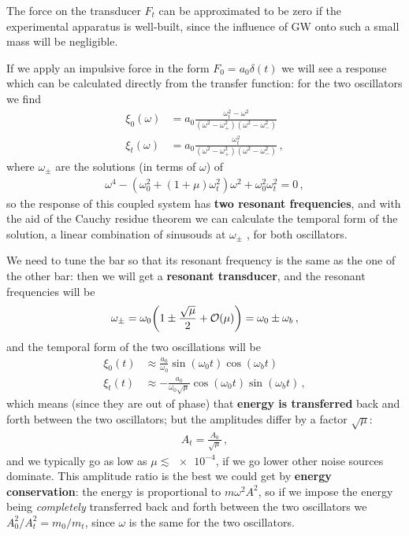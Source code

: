 \documentclass[main.tex]{subfiles}
\begin{document}
The force on the transducer \(F_t\) can be approximated to be zero if the experimental apparatus is well-built, since the influence of GW onto such a small mass will be negligible.

If we apply an impulsive force in the form \(F_0 = a_0 \delta (t)\) we will see a response which can be calculated directly from the transfer function: for the two oscillators we find 
%
\begin{align}
\xi_0 (\omega ) &= a_0 \frac{\omega_{t}^2 - \omega^2}{(\omega^2 - \omega^2_{+} ) (\omega^2- \omega^2_{-})}  \\
\xi_{t} (\omega ) &= a_0 \frac{\omega_{t}^2}{(\omega^2 - \omega^2_{+}) (\omega^2- \omega^2_{-})}
\,,
\end{align}
%
where \(\omega_{\pm}\) are the solutions (in terms of \(\omega \)) of 
%
\begin{align}
\omega^4 - (\omega^2_{0} + (1+\mu )\omega_{t}^2) \omega^2 + \omega_0^2 \omega_t^2 = 0
\,,
\end{align}
%
so the response of this coupled system has \textbf{two resonant frequencies}, and with the aid of the Cauchy residue theorem we can calculate the temporal form of the solution, a linear combination of sinusouds at \(\omega_{\pm}\) \cite[eqs.\ 8.79--80]{maggioreGravitationalWavesVolume2007}, for both oscillators.

We need to tune the bar so that its resonant frequency is the same as the one of the other bar: then we will get a \textbf{resonant transducer}, and the resonant frequencies will be 
%
\begin{align}
\omega_{\pm} = \omega_0 \qty(1 \pm \frac{\sqrt{\mu }}{2} + \mathcal{O}(\mu ))= \omega_0 \pm \omega_{b}
\,,
\end{align}
%
and the temporal form of the two oscillations will be 
%
\begin{align}
\xi_0 (t) &\approx \frac{a_0 }{\omega_0} \sin(\omega_0 t) \cos(\omega_{b}t)  \\
\xi_t (t) &\approx - \frac{a_0 }{\omega_0 \sqrt{\mu }} \cos(\omega_0 t) \sin(\omega_{b} t)
\,,
\end{align}
%
which means (since they are out of phase) that \textbf{energy is transferred} back and forth between the two oscillators; but the amplitudes differ by a factor \(\sqrt{\mu }\): 
%
\begin{align}
A_t = \frac{A_0 }{\sqrt{\mu }}
\,,
\end{align}
%
and we typically go as low as \(\mu \lesssim \num{e-4}\), if we go lower other noise sources dominate.
This amplitude ratio is the best we could get by \textbf{energy conservation}: the energy is proportional to \(m \omega^2 A^2\), so if we impose the energy being \emph{completely} transferred back and forth between the two oscillators we \(A_0^2 / A_t^2 = m_0 / m_t \), since \(\omega \) is the same for the two oscillators.
\end{document}
